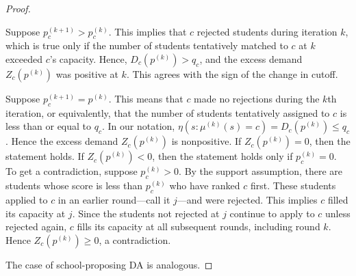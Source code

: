 \documentclass[12pt]{article}
\numberwithin{equation}{subsection}
\theoremstyle{definition}
\begin{document}
\begin{proof}
\begin{enumerate}
Suppose $p_c^{(k+1)} > p_c^{(k)}$. This implies that $c$ rejected students during iteration $k$, which is true only if the number of students tentatively matched to $c$ at $k$ exceeded $c$’s capacity. Hence, $D_c ( p^{(k)}) > q_c$, and the excess demand $Z_c(p^{(k)})$ was positive at $k$. This agrees with the sign of the change in cutoff. 

Suppose $p_c^{(k+1)} = p^{(k)}$. This means that $c$ made no rejections during the $k$th iteration, or equivalently, that the number of students tentatively assigned to $c$ is less than or equal to $q_c$. In our notation, $\eta(s: \mu^{(k)} (s) = c)  = D_c (p^{(k)}) \leq q_c$. Hence the excess demand $Z_c(p^{(k)})$ is nonpositive. If $Z_c(p^{(k)}) = 0$, then the statement holds. If $Z_c(p^{(k)}) < 0$, then the statement holds only if $p_c^{(k)} = 0$. To get a contradiction, suppose $p_c^{(k)} > 0$. By the support assumption, there are students whose score is less than $p_c^{(k)}$ who have ranked $c$ first. These students applied to $c$ in an earlier round---call it $j$---and were rejected. This implies $c$ filled its capacity at $j$. Since the students not rejected at $j$ continue to apply to $c$ unless rejected again, $c$ fills its capacity at all subsequent rounds, including round $k$. Hence $Z_c(p^{(k)}) \geq 0$, a contradiction.
\end{enumerate}
The case of school-proposing DA is analogous. 
\end{proof}
\end{document}
